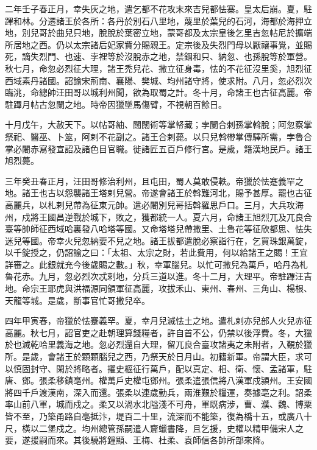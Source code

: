 \begin{pinyinscope}
 二年壬子春正月，幸失灰之地，遣乞都不花攻末來吉兒都怯寨。皇太后崩。夏，駐蹕和林。分遷諸王於各所：各丹於別石八里地，蔑里於葉兒的石河，海都於海押立地，別兒哥於曲兒只地，脫脫於葉密立地，蒙哥都及太宗皇後乞里吉忽帖尼於擴端所居地之西。仍以太宗諸后妃家貲分賜親王。定宗後及失烈門母以厭禳事覺，並賜死，謫失烈門、也速、孛裡等於沒脫赤之地，禁錮和只、納忽、也孫脫等於軍營。秋七月，命忽必烈征大理，諸王禿兒花、撒立征身毒，怯的不花征沒里奚，旭烈征西域素丹諸國。詔諭宋荊南、襄陽、樊城、均州諸守將，使求附。八月，忽必烈次臨洮，命總帥汪田哥以城利州聞，欲為取蜀之計。冬十月，命諸王也古征高麗。帝駐蹕月帖古忽闌之地。時帝因獵墜馬傷臂，不視朝百餘日。



 十月戊午，大赦天下。以帖哥紬、闊闊術等掌帑藏；孛闌合剌孫掌斡脫；阿忽察掌祭祀、醫巫、卜筮，阿剌不花副之。諸王合剌薨。以只兒斡帶掌傳驛所需，孛魯合掌必闍赤寫發宣詔及諸色目官職。徙諸匠五百戶修行宮。是歲，籍漢地民戶。諸王旭烈薨。



 三年癸丑春正月，汪田哥修治利州，且屯田，蜀人莫敢侵軼。帝獵於怯蹇義罕之地。諸王也古以怨襲諸王塔剌兒營。帝遂會諸王於斡難河北，賜予甚厚。罷也古征高麗兵，以札剌兒帶為征東元帥。遣必闍別兒哥括斡羅思戶口。三月，大兵攻海州，戍將王國昌逆戰於城下，敗之，獲都統一人。夏六月，命諸王旭烈兀及兀良合臺等帥師征西域哈裏發八哈塔等國。又命塔塔兒帶撒里、土魯花等征欣都思、怯失迷兒等國。帝幸火兒忽納要不兒之地。諸王拔都遣脫必察詣行在，乞買珠銀萬錠，以千錠授之，仍詔諭之曰：「太祖、太宗之財，若此費用，何以給諸王之賜！王宜詳審之。此銀就充今後歲賜之數。」秋，幸軍腦兒。以忙可撒兒為萬戶，哈丹為札魯花赤。九月，忽必烈次忒剌地，分兵三道以進。冬十二月，大理平。帝駐蹕汪吉地。命宗王耶虎與洪福源同領軍征高麗，攻拔禾山、東州、春州、三角山、楊根、天龍等城。是歲，斷事官忙哥撒兒卒。



 四年甲寅春，帝獵於怯蹇義罕。夏，幸月兒滅怯土之地。遣札剌亦兒部人火兒赤征高麗。秋七月，詔官吏之赴朝理算錢糧者，許自首不公，仍禁以後浮費。冬，大獵於也滅乾哈里義海之地。忽必烈還自大理，留兀良合臺攻諸夷之未附者，入覲於獵所。是歲，會諸王於顆顆腦兒之西，乃祭天於日月山。初籍新軍。帝謂大臣，求可以慎固封守、閑於將略者。擢史樞征行萬戶，配以真定、相、衛、懷、孟諸軍，駐唐、鄧。張柔移鎮亳州。權萬戶史權屯鄧州。張柔遣張信將八漢軍戍潁州。王安國將四千戶渡漢南，深入而還。張柔以連歲勤兵，兩淮艱於糧運，奏據亳之利。詔柔率山前八軍，城而戍之。柔又以渦水北隘淺不可舟，軍既病涉，曹、濮、魏、博粟皆不至，乃築甬路自亳抵汴，堤百二十里，流深而不能築，復為橋十五，或廣八十尺，橫以二堡戍之。均州總管孫嗣遣人齎蠟書降，且乞援，史權以精甲備宋人之要，遂援嗣而來。其後驍將鐘顯、王梅、杜柔、袁師信各帥所部來降。




\end{pinyinscope}
